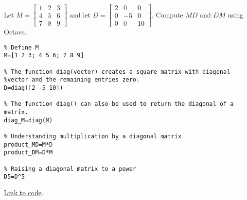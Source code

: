 \documentclass{ximera}
\begin{document}
\begin{exploration}\label{init:multiplydiag}
Let
$M =\begin{bmatrix}1 & 2 & 3\\ 4&5&6\\7&8&9\end{bmatrix}$ and let $D =\begin{bmatrix}2 & 0 & 0\\ 0&-5&0\\0&0&10\end{bmatrix}$.  Compute $MD$ and $DM$ using Octave.


\begin{verbatim}
% Define M
M=[1 2 3; 4 5 6; 7 8 9]

% The function diag(vector) creates a square matrix with diagonal 
%vector and the remaining entries zero.
D=diag([2 -5 10]) 

% The function diag() can also be used to return the diagonal of a matrix.  
diag_M=diag(M)

% Understanding multiplication by a diagonal matrix
product_MD=M*D
product_DM=D*M

% Raising a diagonal matrix to a power
D5=D^5
\end{verbatim}

\href{https://sagecell.sagemath.org/?z=eJx1zztPwzAUBeA9Uv7DWSqRSlS0EB6qsnn1gmCqSnWb3LSWErv4QYFfz00ilQExWvb5zvEMiltjGTrPdLVZYoXbNe5Q4n6NBzziaZtneTbDy5HRJltH4ywaQ4erD66j8wVqzxQ5gBDeE3lGT9GbT5xNPI4vnaUOYkwBkG0QRfPck7HGHsBWAiJ8s3eLPFPV6G9WuC6xvNkW-G-ClJMFdcFhz0iBRXYCx-Tt2HGpd63sm4YtIN5wsdNTkS4m_9U27EOUfcOoPnXRnDpT09i3_xLgwk1Snp28a1Idd1pVeq5-z0pXaq4n9plMGMA_8WEr4eTO7OXTZaXeyh9wS35E&lang=octave&interacts=eJyLjgUAARUAuQ==}{Link to code}.



\end{exploration}
\end{document}
